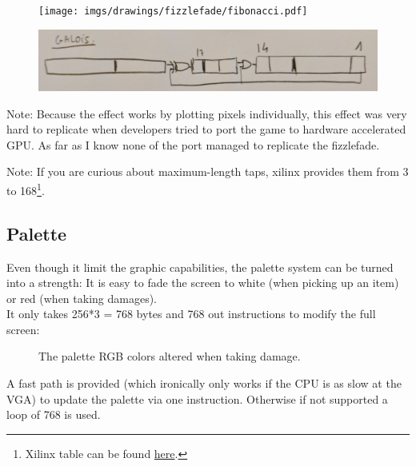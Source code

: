 \par
\begin{minipage}{\textwidth}

\end{minipage}
\par

\begin{figure}[H] \centering \texttt{[image: imgs/drawings/fizzlefade/fibonacci.pdf]} \end{figure}
\begin{figure}[H] \centering \includegraphics[width=\textwidth]{imgs/drawings/fizzlefade/galois.png} \end{figure}
      
Note: Because the effect works by plotting pixels individually, this effect was very hard to replicate when developers tried to port the game to hardware accelerated GPU. As far as I know none of the port managed to replicate the fizzlefade.

Note: If you are curious about maximum-length taps, xilinx provides them from 3 to 168\footnote{Xilinx table can be found \href{http://www.xilinx.com/support/documentation/application\_notes/xapp052.pdf}{here}.}.










\subsection{Palette}
Even though it limit the graphic capabilities, the palette system can be turned into a strength: It is easy to fade the screen to white (when picking up an item) or red (when taking damages).\\
It only takes 256*3 = 768 bytes and 768 out instructions to modify the full screen:
\begin{figure}[H]
  \centering
 \caption{The palette RGB colors altered when taking damage.} \label{fig:palette_damage}
\end{figure}
A fast path is provided (which ironically only works if the CPU is as slow at the VGA) to update the palette via one  instruction. Otherwise if not supported a loop of 768  is used.
\begin{minipage}{\linewidth}

\end{minipage}









